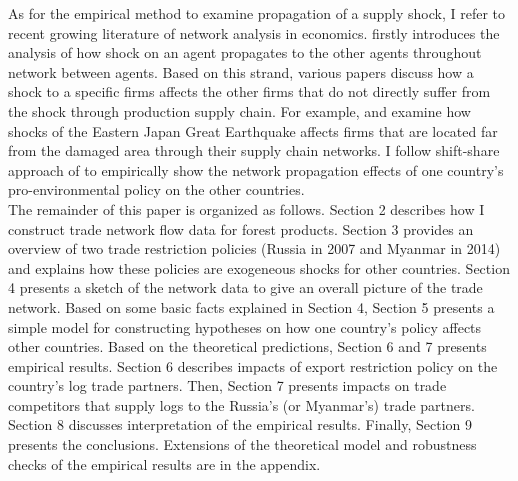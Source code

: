 \documentclass[a4paper,12pt]{article}
\begin{document}
As for the empirical method to examine propagation of a supply shock, I refer to recent growing literature of network analysis in economics. \cite{acemoglu2012network} firstly introduces the analysis of how shock on an agent propagates to the other agents throughout network between agents. Based on this strand, various papers discuss how a shock to a specific firms affects the other firms that do not directly suffer from the shock through production supply chain. For example, \cite{barrot2016input} and \cite{carvalho2021supply} examine how shocks of the Eastern Japan Great Earthquake affects firms that are located far from the damaged area through their supply chain networks. I follow shift-share approach of \cite{huneeus2018production} to empirically show the network propagation effects of one country's pro-environmental policy on the other countries.\\

The remainder of this paper is organized as follows. Section 2 describes how I construct trade network flow data for forest products. Section 3 provides an overview of two trade restriction policies (Russia in 2007 and Myanmar in 2014) and explains how these policies are exogeneous shocks for other countries. Section 4 presents a sketch of the network data to give an overall picture of the trade network. Based on some basic facts explained in Section 4, Section 5 presents a simple model for constructing hypotheses on how one country's policy affects other countries. Based on the theoretical predictions, Section 6 and 7 presents empirical results. Section 6 describes impacts of export restriction policy on the country's log trade partners. Then, Section 7 presents impacts on trade competitors that supply logs to the Russia's (or Myanmar's) trade partners. Section 8 discusses interpretation of the empirical results. Finally, Section 9 presents the conclusions. Extensions of the theoretical model and robustness checks of the empirical results are in the appendix.\\
\end{document}
